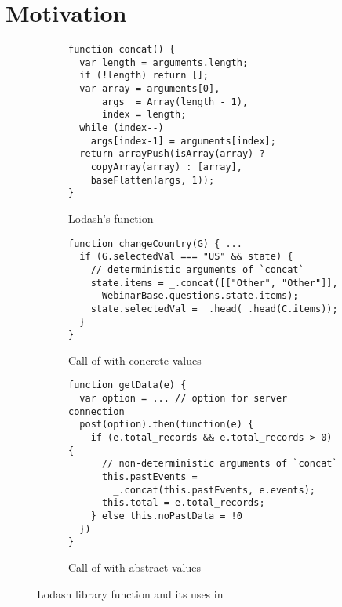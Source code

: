 \section{Motivation}\label{sec:motivation}

\begin{figure}[t]
  \centering
  \begin{subfigure}[t]{0.5\textwidth}
    \begin{lstlisting}[style=myJSstyle]
function concat() {
  var length = arguments.length;
  if (!length) return [];
  var array = arguments[0],
      args  = Array(length - 1),
      index = length;
  while (index--)
    args[index-1] = arguments[index];
  return arrayPush(isArray(array) ?
    copyArray(array) : [array],
    baseFlatten(args, 1));
}
    \end{lstlisting}
    \vspace*{-1em}
    \caption{Lodash's  function}
    \label{fig:concat}
  \end{subfigure}
  \begin{subfigure}[t]{0.5\textwidth}
    \begin{lstlisting}[style=myJSstyle,firstnumber=13]
function changeCountry(G) { ...
  if (G.selectedVal === "US" && state) {
    // deterministic arguments of `concat`
    state.items = _.concat([["Other", "Other"]],
      WebinarBase.questions.state.items);
    state.selectedVal = _.head(_.head(C.items));
  }
}
    \end{lstlisting}
    \vspace*{-1.5em}
    \caption{Call of  with concrete values}
    \label{fig:changeCountry}
  \end{subfigure}
  \begin{subfigure}[t]{0.5\textwidth}
    \begin{lstlisting}[style=myJSstyle,firstnumber=22]
function getData(e) {
  var option = ... // option for server connection
  post(option).then(function(e) {
    if (e.total_records && e.total_records > 0) {
      // non-deterministic arguments of `concat`
      this.pastEvents =
        _.concat(this.pastEvents, e.events);
      this.total = e.total_records;
    } else this.noPastData = !0
  })
}
    \end{lstlisting}
    \vspace*{-1.5em}
    \caption{Call of  with abstract values}
    \label{fig:getData}
  \end{subfigure}
  \vspace*{-1em}
  \caption{Lodash library function and its uses in }
  \label{fig:example}
  \vspace*{-1.5em}
\end{figure}


